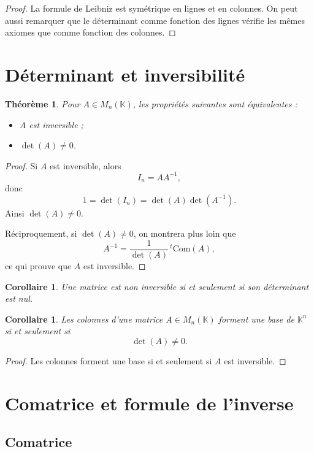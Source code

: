 \documentclass[11pt,a4paper]{article}
\newtheorem{theoreme}[definition]{Théorème}
\newtheorem{corollaire}[definition]{Corollaire}
\theoremstyle{remark}
\newcommand{\K}{\mathbb{K}}
\begin{document}
\begin{proof}
La formule de Leibniz est symétrique en lignes et en colonnes. On peut aussi remarquer que le déterminant comme fonction des lignes vérifie les mêmes axiomes que comme fonction des colonnes.
\end{proof}

\section{Déterminant et inversibilité}

\begin{theoreme}
Pour \(A\in M_n(\K)\), les propriétés suivantes sont équivalentes :
\begin{itemize}
    \item \(A\) est inversible ;
    \item \(\det(A)\neq 0\).
\end{itemize}
\end{theoreme}

\begin{proof}
Si \(A\) est inversible, alors
\[
I_n=AA^{-1},
\]
donc
\[
1=\det(I_n)=\det(A)\det(A^{-1}).
\]
Ainsi \(\det(A)\neq 0\).

Réciproquement, si \(\det(A)\neq 0\), on montrera plus loin que
\[
A^{-1}=\frac{1}{\det(A)}\,{}^t\!\mathrm{Com}(A),
\]
ce qui prouve que \(A\) est inversible.
\end{proof}

\begin{corollaire}
Une matrice est non inversible si et seulement si son déterminant est nul.
\end{corollaire}

\begin{corollaire}
Les colonnes d’une matrice \(A\in M_n(\K)\) forment une base de \(\K^n\) si et seulement si
\[
\det(A)\neq 0.
\]
\end{corollaire}

\begin{proof}
Les colonnes forment une base si et seulement si \(A\) est inversible.
\end{proof}

\section{Comatrice et formule de l’inverse}

\subsection{Comatrice}
\end{document}
